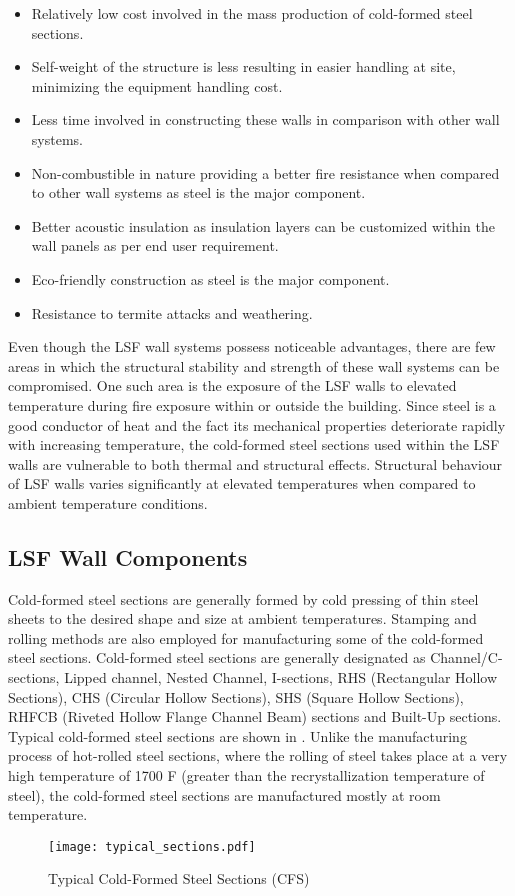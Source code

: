 \begin{itemize}
\item Relatively low cost involved in the mass production of cold-formed steel sections.
\item Self-weight of the structure is less resulting in easier handling at site, minimizing the equipment handling cost.
\item Less time involved in constructing these walls in comparison with other wall systems.
\item Non-combustible in nature providing a better fire resistance when compared to other wall systems as steel is the major component.
\item Better acoustic insulation as insulation layers can be customized within the wall panels as per end user requirement.
\item Eco-friendly construction as steel is the major component.
\item Resistance to termite attacks and weathering.
\end{itemize}

Even though the LSF wall systems possess noticeable advantages, there are few areas in which the structural stability and strength of these wall systems can be compromised. One such area is the exposure of the LSF walls to elevated temperature during fire exposure within or outside the building. Since steel is a good conductor of heat and the fact its mechanical properties deteriorate rapidly with increasing temperature, the cold-formed steel sections used within the LSF walls are vulnerable to both thermal and structural effects. Structural behaviour of LSF walls varies significantly at elevated temperatures when compared to ambient temperature conditions.

\subsection{LSF Wall Components}

Cold-formed steel sections are generally formed by cold pressing of thin steel sheets to the desired shape and size at ambient temperatures. Stamping and rolling methods are also employed for manufacturing some of the cold-formed steel sections. Cold-formed steel sections are generally designated as Channel/C-sections, Lipped channel, Nested Channel, I-sections, RHS (Rectangular Hollow Sections), CHS (Circular Hollow Sections), SHS (Square Hollow Sections), RHFCB (Riveted Hollow Flange Channel Beam) sections and Built-Up sections. Typical cold-formed steel sections are shown in . Unlike the manufacturing process of hot-rolled steel sections, where the rolling of steel takes place at a very high temperature of 1700 \degree F (greater than the recrystallization temperature of steel), the cold-formed steel sections are manufactured mostly at room temperature.
\begin{figure}[htbp]
	\begin{center}	
		\texttt{[image: typical\_sections.pdf]}
		\caption{Typical Cold-Formed Steel Sections (CFS)}
		\label{fig:typical_section}
	\end{center}
\end{figure}

